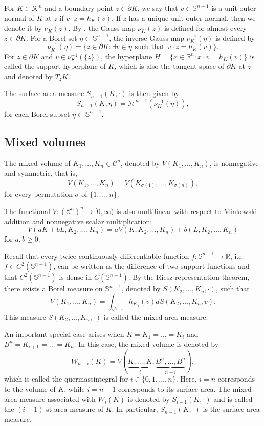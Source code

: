 \documentclass[12pt, oneside,reqno]{amsart}
\numberwithin{equation}{section}
\newtheorem{definition and theorem}[theorem]{Definition and Theorem}
\theoremstyle{plain}
\theoremstyle{remark}
\theoremstyle{definition}
\newcommand{\sn}{{\mathbb S}^{n-1}}
\newcommand{\tr}{\mathbb R}
\newcommand{\rn}{\mathbb R^n}
\newcommand{\tk}{\mathcal{K}}
\newcommand{\tH}{\mathcal{H}}
\begin{document}
For $K\in\tk^n$ and a boundary point $z\in\partial K$, we say that $v\in\sn$ is a unit outer normal of $K$ at $z$ if $ v\cdot z =h_K(v)$. If $z$ has a unique unit outer normal, then we denote it by $\nu_K(z)$. By \cite[Theorem 2.2.11]{Sch}, the Gauss map $\nu_K(z)$ is defined for almost every $z\in\partial K$. For a Borel set $\eta\subset\sn$, the inverse Gauss map $\nu_K^{-1}(\eta)$ is defined by
\[\nu_K^{-1}(\eta)=\{z\in\partial K: \exists v\in \eta~~\text{such that}~~ v\cdot z=h_K(v)\}.\]
For $z\in \partial K$ and $v\in \nu_K^{-1}(\{z\})$, the hyperplane $H=\{x\in\rn: x\cdot v=h_K(v)\}$ is called the support hyperplane of $K$, which is also the tangent space of $\partial K$ at $z$ and denoted by $T_zK$.

The surface area measure $S_{n-1}(K,\cdot)$ is then given by
\[S_{n-1}(K,\eta)=\tH^{n-1}(\nu_K^{-1}(\eta)),\]
for each Borel subset $\eta\subset\sn$.


\subsection{Mixed volumes}

The mixed volume of  $K_1,\ldots ,K_n\in\mathcal{C}^n$, denoted by $V(K_1,\ldots, K_n)$, is nonnegative and symmetric, that is, 
\[V(K_1,\ldots,K_n)=V(K_{\sigma(1)},\ldots, K_{\sigma(n)}),\]
for every permutation $\sigma$ of $\{1,\ldots, n\}$.

The functional $V: (\mathcal{C}^n)^n\rightarrow [0,\infty)$ is also multilinear with respect to Minkowski addition and nonnegative scalar multiplication:
\[V(aK+bL,K_2,\ldots, K_n)=aV(K,K_2,\ldots,K_n)+b(L,K_2,\ldots, K_n)\]
for $a,b\ge 0$. 

Recall that every twice continuously differentiable function $f:\sn\rightarrow \tr$, i.e. $f\in C^2(\sn)$, can be written as the difference of two support functions and that $C^2(\sn)$ is dense in $C(\sn)$. By the Riesz representation theorem, there exists a Borel measure on $\sn$, denoted by $S(K_2,\ldots, K_n,\cdot)$, such that
\[V(K_1,\ldots, K_n)=\int_{\sn}h_{K_1}(v)dS(K_2,\ldots, K_n,v).\]
This measure $S(K_2,\ldots, K_n,\cdot)$ is called the mixed area measure.

An important special case arises when $K=K_1=\ldots =K_{i}$ and $B^n=K_{i+1}=\ldots =K_n$. In this case, the mixed volume is denoted by 
\[W_{n-i}(K)=V(\underbrace{K,\ldots, K}_{i}, \underbrace{B^n,\ldots, B^n}_{n-i}),\]
which is called the quermassintegral for $i\in\{0,1,\ldots, n\}$. Here, $i=n$ corresponds to the volume of $K$, while $i=n-1$ corresponds to its surface area. The mixed area measure associated with $W_i(K)$ is denoted by $S_{i-1}(K,\cdot)$ and is called the $(i-1)$-st area measure of $K$. In particular, $S_{n-1}(K,\cdot)$ is the surface area measure.
\end{document}
